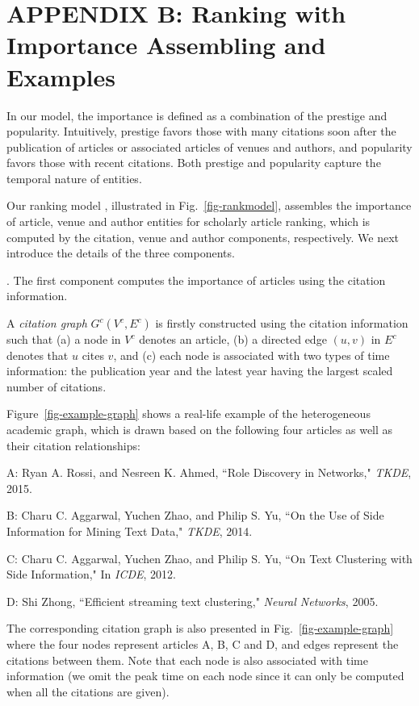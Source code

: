 \section*{APPENDIX B: Ranking with Importance Assembling and Examples}
\label{sec-model-app}

In our model, the importance is defined as a combination of the prestige and popularity. Intuitively, prestige favors those with many citations soon after the publication of articles or associated articles of venues and authors, and popularity favors those with recent citations. Both prestige and popularity capture the temporal nature of entities. %

Our ranking model \ensemblerank,  illustrated in Fig.~\ref{fig-rankmodel}, assembles the importance of article, venue and author entities for scholarly article ranking, which is computed by the citation, venue and author components, respectively.
%
We next introduce the details of the three components.


.
The first component computes the importance of articles using the citation information.

A {\em citation graph} $G^c(V^c, E^c)$ is firstly constructed using the citation information such that (a) a node in $V^c$ denotes an article, (b) a directed edge $(u,v)$ in $E^c$ denotes that $u$ cites $v$, and (c) each node is associated with two types of time information: the publication year and the latest year having the largest scaled number of citations.


\begin{example} \label{eg-model-citation}
Figure~\ref{fig-example-graph} shows a real-life example of the heterogeneous academic graph, which is drawn based on the following four articles as well as their citation relationships:

\begin{small}
\bi
\item A: Ryan A. Rossi, and Nesreen K. Ahmed, ``Role Discovery in Networks," {\em TKDE}, 2015.
\item B: Charu C. Aggarwal, Yuchen Zhao, and Philip S. Yu, ``On the Use of Side Information for Mining Text Data," {\em TKDE}, 2014.
\item C: Charu C. Aggarwal, Yuchen Zhao, and Philip S. Yu, ``On Text Clustering with Side Information," In {\em ICDE}, 2012.
\item D: Shi Zhong, ``Efficient streaming text clustering," {\em Neural Networks}, 2005.
\ei
\end{small}

The corresponding citation graph is also presented in Fig.~\ref{fig-example-graph} where the four nodes represent articles A, B, C and D, and edges represent the citations between them. Note that each node is also associated with time information (we omit the peak time on each node since it can only be computed when all the citations are given).
\end{example}

